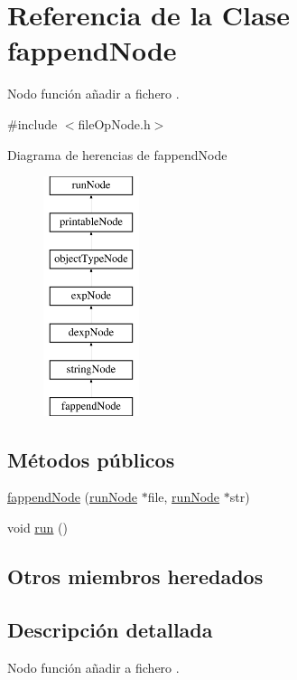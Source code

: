 \hypertarget{classfappendNode}{\section{Referencia de la Clase fappend\-Node}
\label{classfappendNode}
}


Nodo función añadir a fichero .  




{\ttfamily \#include $<$file\-Op\-Node.\-h$>$}

Diagrama de herencias de fappend\-Node\begin{figure}[H]
\begin{center}
\leavevmode
\includegraphics[height=7.000000cm]{classfappendNode}
\end{center}
\end{figure}
\subsection*{Métodos públicos}
\begin{DoxyCompactItemize}
\item 
\hyperlink{classfappendNode_a7cd57233e2f352716a011cc770999ef9}{fappend\-Node} (\hyperlink{classrunNode}{run\-Node} $\ast$file, \hyperlink{classrunNode}{run\-Node} $\ast$str)
\item 
void \hyperlink{classfappendNode_a872c68dabc8306cc405452ce4200b7bd}{run} ()
\end{DoxyCompactItemize}
\subsection*{Otros miembros heredados}


\subsection{Descripción detallada}
Nodo función añadir a fichero . 

